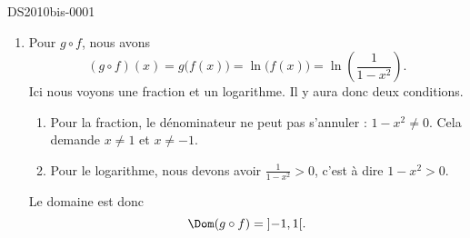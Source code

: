 \begin{corrige}{DS2010bis-0001}
\begin{enumerate}
\begin{enumerate}
				\item
					Pour $g\circ f$, nous avons
					\begin{equation}
						(g\circ f)(x)=g\big( f(x) \big)=\ln\big( f(x) \big)=\ln\left( \frac{1}{ 1-x^2 } \right).
					\end{equation}
					Ici nous voyons une fraction et un logarithme. Il y aura donc deux conditions.
					\begin{enumerate}
						\item
							Pour la fraction, le dénominateur ne peut pas s'annuler : $1-x^2\neq 0$. Cela demande $x\neq 1$ et $x\neq -1$.
						\item
							Pour le logarithme, nous devons avoir $\frac{1}{ 1-x^2 }>0$, c'est à dire $1-x^2>0$. 
					\end{enumerate}
					Le domaine est donc
					\begin{equation}
						\Dom(g\circ f)=\mathopen] -1 , 1 \mathclose[.
					\end{equation}
			\end{enumerate}
			
	\end{enumerate}

\end{corrige}
